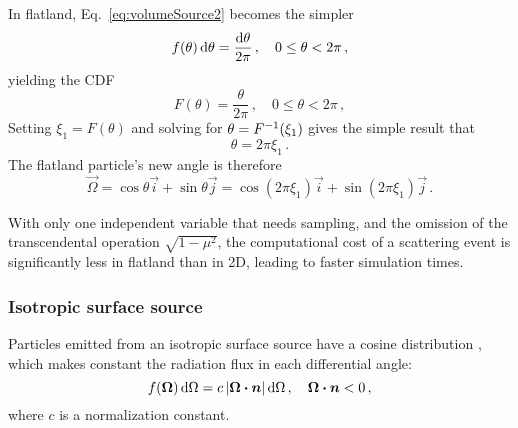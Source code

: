 In flatland, Eq.~\eqref{eq:volumeSource2} becomes the simpler
\begin{equation*}
  f(\theta) \mathop{}\!\mathrm{d}\theta = \frac{\mathop{}\!\mathrm{d}\theta}{2\pi} \,,
  \quad 0 \le \theta < 2\pi\,,
\end{equation*}
yielding the CDF
\begin{equation}\label{eq:volumeSourceFlatland}
  F(\theta) = \frac{\theta}{2\pi}\,,
  \quad 0 \le \theta < 2\pi\,,
\end{equation}
Setting $\xi_1 = F(\theta)$ and solving for $\theta = F^{-1}(\xi_1)$ gives the
simple result that
\begin{equation*}
  \theta = 2\pi \xi_1\,.
\end{equation*}
The flatland particle's new angle is therefore
\begin{equation*}
  \vec{\Omega} = \cos \theta \vec{i} + \sin \theta \vec{j}
  = \cos(2\pi\xi_1) \vec{i} + \sin(2\pi\xi_1) \vec{j}\,.
\end{equation*}

With only one independent variable that needs sampling, and the omission of
the transcendental operation $\sqrt{1-\mu^2}$, the computational cost of a
scattering event is significantly less in flatland than in 2D, leading to
faster simulation times.

\subsubsection{Isotropic surface source}\label{sec:isoSurface}
Particles emitted from an isotropic surface source have a cosine distribution
\cite{Gre2002}, which makes constant the radiation flux in each differential
angle:
\begin{equation}\label{eq:surfaceSource1}
  f(\bm{\Omega}) \mathop{}\!\mathrm{d} \Omega = c \left| \bm{\Omega}\bm{\cdot} \bm{n} \right| \mathop{}\!\mathrm{d} \Omega \,,
\quad \bm{\Omega}\bm{\cdot} \bm{n} < 0 \,,
\end{equation}
where $c$ is a normalization constant.

